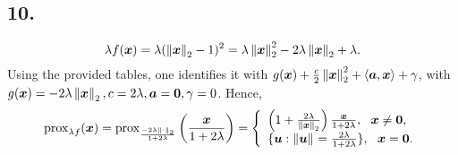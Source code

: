 \subsection{10.}
%
\begin{equation*}
    \lambda f(\boldsymbol x) = \lambda (\left\lVert\boldsymbol x\right\rVert_{2}-1)^2 
    = \lambda \left\lVert\boldsymbol x\right\rVert_{2}^2
    - 2 \lambda \left\lVert\boldsymbol x\right\rVert_{2} + \lambda.
\end{equation*}
%
Using the provided tables, one identifies it with 
$g(\boldsymbol x) + \frac{c}{2} \left\lVert\boldsymbol x\right\rVert_{2}^2 + \langle \boldsymbol a, \boldsymbol x \rangle
+ \gamma$, with $g(\boldsymbol x) = -2\lambda\left\lVert\boldsymbol x\right\rVert_{2}, c=2\lambda,
\boldsymbol a=\boldsymbol 0, \gamma=0$.
Hence,
%
\begin{equation*}
    \operatorname{prox}_{\lambda f}(\boldsymbol x) = 
    \operatorname{prox}_{\frac{-2\lambda\left\lVert\cdot\right\rVert_{2}}{1+2\lambda}}
    \bigg(\frac{\boldsymbol x}{1+2\lambda} \bigg) = 
    \left\{
        \begin{array}{ll}
            \left( 1+ \frac{2\lambda}{\left\lVert\boldsymbol x\right\rVert_{2}} 
            \right) \frac{\boldsymbol x}{1+2\lambda},~~\boldsymbol x \neq \boldsymbol 0, \\
            \{ \boldsymbol u: \left\lVert\boldsymbol u\right\rVert_{}= \frac{2\lambda}{1+2\lambda} \},~~ \boldsymbol x = \boldsymbol 0.
        \end{array}
      \right.
\end{equation*}
